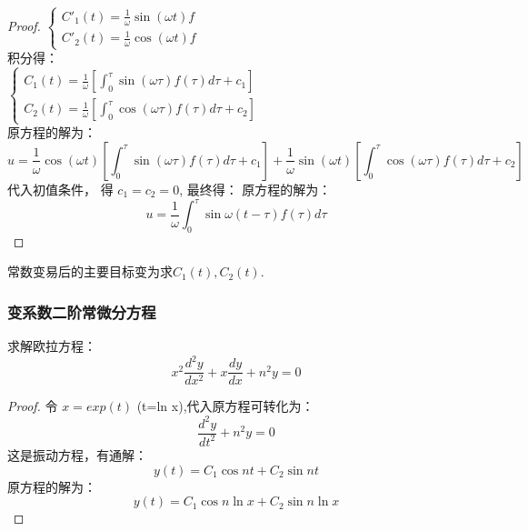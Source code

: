 \begin{example}
\begin{proof}
$\displaystyle \begin{cases}
	C'_1(t)=\frac{1}{\omega} \sin(\omega t) f \\ 
	C'_2(t)=\frac{1}{\omega} \cos(\omega t) f 
\end{cases} $ \\
积分得：\\  	\vspace{0.3cm}
$\displaystyle \begin{cases}
	C_1(t)=\frac{1}{\omega} [\int_{0}^{\tau} \sin(\omega \tau) f(\tau)  d\tau +c_1 ]\\ 
	C_2(t)=\frac{1}{\omega} [\int_{0}^{\tau} \cos(\omega \tau) f(\tau)  d\tau +c_2 ]\
\end{cases} $ \\
原方程的解为：\\
\begin{equation*}
	u=\frac{1}{\omega}\cos(\omega t)[\int_{0}^{\tau} \sin(\omega \tau) f(\tau)  d\tau +c_1 ] +\frac{1}{\omega} \sin(\omega t) [\int_{0}^{\tau} \cos(\omega \tau) f(\tau)  d\tau +c_2 ]
\end{equation*}   
代入初值条件， 得 $c_1=c_2=0$, 最终得：  
原方程的解为：\\
\begin{equation*}
	u=\frac{1}{\omega}\int_{0}^{\tau} \sin\omega (t-\tau)  f(\tau)  d\tau
\end{equation*}   
\end{proof}
\end{example}

\begin{note}
	 常数变易后的主要目标变为求$C_1(t), C_2(t) $.
\end{note}

\subsubsection{变系数二阶常微分方程}
\begin{example} %
	求解欧拉方程：
\begin{equation*}
	x^2 \frac{d^2 y}{d x^2} +x \frac{d y}{d x} +n^2 y =0 
\end{equation*}     

	\begin{proof} 
		令 $x=exp(t) $ (t=ln x),代入原方程可转化为：
		\begin{equation*}
		 \frac{d^2 y}{d t^2}  +n^2 y =0 
		\end{equation*}     
		这是振动方程，有通解：
		\begin{equation*}
			y(t)=C_1 \cos n t +C_2 \sin n t
		\end{equation*}    
		原方程的解为：\\
    	\begin{equation*}
    	y(t)=C_1 \cos n \ln x +C_2 \sin n \ln x
        \end{equation*}    
	\end{proof}
\end{example}

